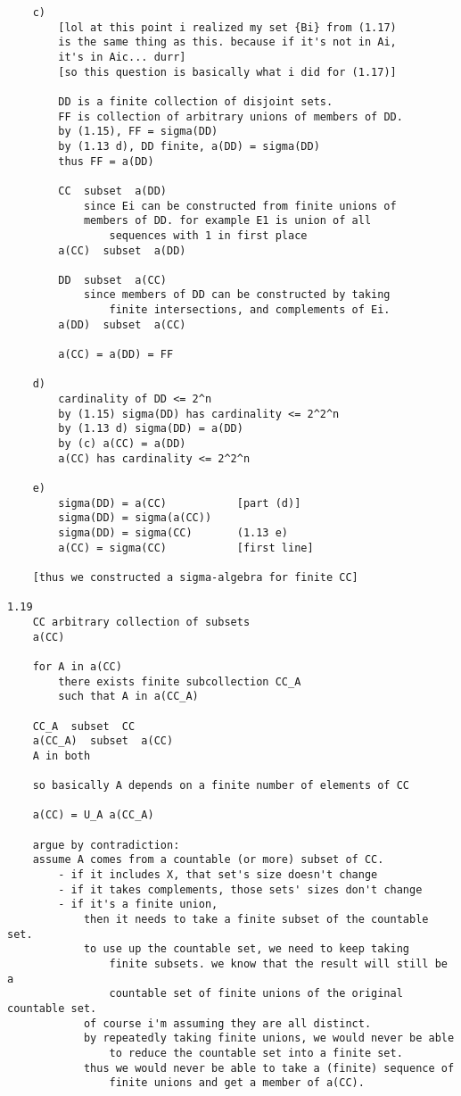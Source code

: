 \documentclass{article}
\begin{document}
\begin{flushleft}
\begin{verbatim}
    c)
        [lol at this point i realized my set {Bi} from (1.17)
        is the same thing as this. because if it's not in Ai, 
        it's in Aic... durr]
        [so this question is basically what i did for (1.17)]

        DD is a finite collection of disjoint sets. 
        FF is collection of arbitrary unions of members of DD. 
        by (1.15), FF = sigma(DD)
        by (1.13 d), DD finite, a(DD) = sigma(DD) 
        thus FF = a(DD)

        CC  subset  a(DD)  
            since Ei can be constructed from finite unions of 
            members of DD. for example E1 is union of all 
                sequences with 1 in first place 
        a(CC)  subset  a(DD)

        DD  subset  a(CC)
            since members of DD can be constructed by taking 
                finite intersections, and complements of Ei.
        a(DD)  subset  a(CC)

        a(CC) = a(DD) = FF 

    d)
        cardinality of DD <= 2^n
        by (1.15) sigma(DD) has cardinality <= 2^2^n
        by (1.13 d) sigma(DD) = a(DD)
        by (c) a(CC) = a(DD)
        a(CC) has cardinality <= 2^2^n

    e)
        sigma(DD) = a(CC)           [part (d)]
        sigma(DD) = sigma(a(CC))
        sigma(DD) = sigma(CC)       (1.13 e)
        a(CC) = sigma(CC)           [first line]

    [thus we constructed a sigma-algebra for finite CC]

1.19
    CC arbitrary collection of subsets 
    a(CC) 

    for A in a(CC)
        there exists finite subcollection CC_A 
        such that A in a(CC_A)

    CC_A  subset  CC 
    a(CC_A)  subset  a(CC)
    A in both

    so basically A depends on a finite number of elements of CC 

    a(CC) = U_A a(CC_A)

    argue by contradiction:
    assume A comes from a countable (or more) subset of CC. 
        - if it includes X, that set's size doesn't change 
        - if it takes complements, those sets' sizes don't change 
        - if it's a finite union, 
            then it needs to take a finite subset of the countable set.
            to use up the countable set, we need to keep taking 
                finite subsets. we know that the result will still be a 
                countable set of finite unions of the original countable set. 
            of course i'm assuming they are all distinct. 
            by repeatedly taking finite unions, we would never be able 
                to reduce the countable set into a finite set. 
            thus we would never be able to take a (finite) sequence of 
                finite unions and get a member of a(CC).


\end{verbatim}
\end{flushleft}
\end{document}
